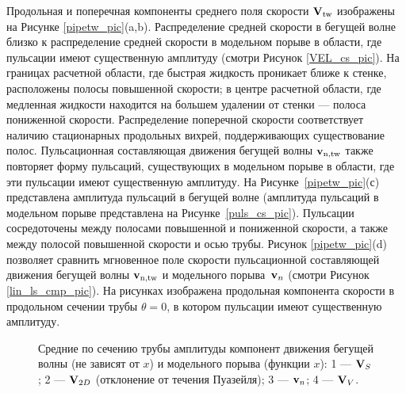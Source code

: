 Продольная и поперечная компоненты среднего поля скорости $\mathbf{V}_\mathrm{tw}$ изображены на Рисунке \ref{pipetw_pic}(a,b). Распределение средней скорости в бегущей волне близко к распределение средней скорости в модельном порыве в области, где пульсации имеют существенную амплитуду (смотри Рисунок \ref{VEL_cs_pic}). На границах расчетной области, где быстрая жидкость проникает ближе к стенке, расположены полосы повышенной скорости; в центре расчетной области, где медленная жидкости находится на большем удалении от стенки --- полоса пониженной скорости. Распределение поперечной скорости соответствует наличию стационарных продольных вихрей, поддерживающих существование полос. Пульсационная составляющая движения бегущей волны $\mathbf{v}_\mathrm{n,tw}$ также повторяет форму пульсаций, существующих в модельном порыве в области, где эти пульсации имеют существенную амплитуду. На Рисунке~\ref{pipetw_pic}(с) представлена амплитуда пульсаций в бегущей волне (амплитуда пульсаций в модельном порыве представлена на Рисунке~\ref{puls_cs_pic}). Пульсации сосредоточены между полосами повышенной и пониженной скорости, а также между полосой повышенной скорости и осью трубы. Рисунок \ref{pipetw_pic}(d) позволяет сравнить мгновенное поле скорости пульсационной составляющей движения бегущей волны $\mathbf{v}_\mathrm{n,tw}$ и модельного порыва~$\mathbf{v}_n$ (смотри Рисунок \ref{lin_ls_cmp_pic}). На рисунках изображена продольная компонента скорости в продольном сечении трубы $\theta = 0$, в котором пульсации имеют существенную амплитуду. 

\begin{figure}
\caption{Средние по сечению трубы амплитуды компонент движения бегущей волны (не зависят от $x$) и модельного порыва (функции $x$): 1 --- $\mathbf{V}_S$; 2 --- $\mathbf{V}_{2D}$ (отклонение от течения Пуазейля); 3 --- $\mathbf{v}_n$; 4 --- $\mathbf{V}_V$.}
\label{pipetw_amp_pic}
\end{figure}

